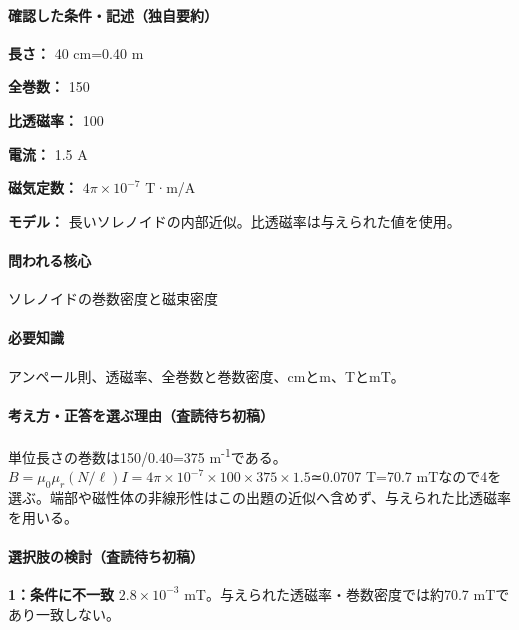 \paragraph{確認した条件・記述（独自要約）}\mbox{}\par

\noindent\textbf{長さ：} 40 cm=\allowbreak{}0.40 m\par

\noindent\textbf{全巻数：} 150\par

\noindent\textbf{比透磁率：} 100\par

\noindent\textbf{電流：} 1.5 A\par

\noindent\textbf{磁気定数：} \(4\pi\times10^{-7}\) T·m/A\par

\noindent\textbf{モデル：} 長いソレノイドの内部近似。比透磁率は与えられた値を使用。\par

\paragraph{問われる核心} ソレノイドの巻数密度と磁束密度

\paragraph{必要知識} アンペール則、透磁率、全巻数と巻数密度、cmとm、TとmT。

\paragraph{考え方・正答を選ぶ理由（査読待ち初稿）} 単位長さの巻数は150/0.40=\allowbreak{}375 m\textsuperscript{-1}である。\(B=\mu_0\mu_r(N/\ell)I=4\pi\times10^{-7}\times100\times375\times1.5\)≃0.0707 T=\allowbreak{}70.7 mTなので4を選ぶ。端部や磁性体の非線形性はこの出題の近似へ含めず、与えられた比透磁率を用いる。

\paragraph{選択肢の検討（査読待ち初稿）}\mbox{}\par

\noindent\textbf{1：条件に不一致} \(2.8\times10^{-3}\) mT。与えられた透磁率・巻数密度では約70.7 mTであり一致しない。\par


